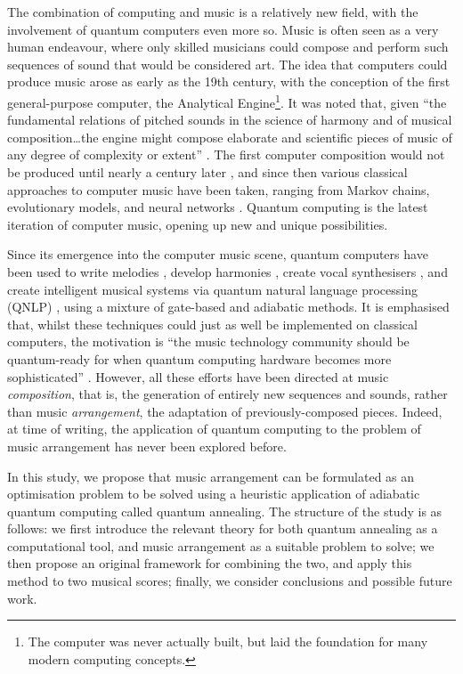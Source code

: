 \documentclass[12pt]{article}
\theoremstyle{definition}
\begin{document}
The combination of computing and music is a relatively new field, with the involvement of quantum computers even more so. Music is often seen as a very human endeavour, where only skilled musicians could compose and perform such sequences of sound that would be considered art. The idea that computers could produce music arose as early as the 19th century, with the conception of the first general-purpose computer, the Analytical Engine\footnote{The computer was never actually built, but laid the foundation for many modern computing concepts.}. It was noted that, given ``the fundamental relations of pitched sounds in the science of harmony and of musical composition\dots the engine might compose elaborate and scientific pieces of music of any degree of complexity or extent'' \cite{lovelace_sketch_1843}. The first computer composition would not be produced until nearly a century later \cite{hiller_experimental_1959}, and since then various classical approaches to computer music have been taken, ranging from Markov chains, evolutionary models, and neural networks \cite{wiggins_composition_1999}. Quantum computing is the latest iteration of computer music, opening up new and unique possibilities.

Since its emergence into the computer music scene, quantum computers have been used to write melodies \cite{miranda_teaching_2022}, develop harmonies \cite{arya_music_2022}, create vocal synthesisers \cite{miranda_quantum_2020}, and create intelligent musical systems via quantum natural language processing (QNLP) \cite{miranda_quantum_2021}, using a mixture of gate-based and adiabatic methods. It is emphasised that, whilst these techniques could just as well be implemented on classical computers, the motivation is ``the music technology community should be quantum-ready for when quantum computing hardware becomes more sophisticated'' \cite{miranda_quantum_2020}. However, all these efforts have been directed at music \emph{composition}, that is, the generation of entirely new sequences and sounds, rather than music \emph{arrangement}, the adaptation of previously-composed pieces. Indeed, at time of writing, the application of quantum computing to the problem of music arrangement has never been explored before.

In this study, we propose that music arrangement can be formulated as an optimisation problem to be solved using a heuristic application of adiabatic quantum computing called quantum annealing.
The structure of the study is as follows: we first introduce the relevant theory for both quantum annealing as a computational tool, and music arrangement as a suitable problem to solve; we then propose an original framework for combining the two, and apply this method to two musical scores; finally, we consider conclusions and possible future work.
\end{document}
